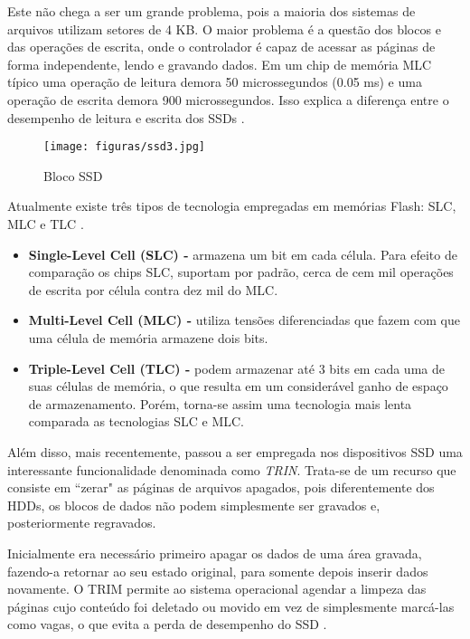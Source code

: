 Este não chega a ser um grande problema, pois a maioria dos sistemas de arquivos utilizam setores de 4 KB. O maior problema é a questão dos blocos e das operações de escrita, onde o controlador é capaz de acessar as páginas de forma independente, lendo e gravando dados. Em um chip de memória MLC típico uma operação de leitura demora 50 microssegundos (0.05 ms) e uma operação de escrita demora 900 microssegundos. Isso explica a diferença entre o desempenho de leitura e escrita dos SSDs \cite{ssd3}.

\begin{figure}[htb]
	\caption{\label{fig:ssd3}Bloco SSD}
	\begin{center}
	    \texttt{[image: figuras/ssd3.jpg]}
	\end{center}
\end{figure}

Atualmente existe três tipos de tecnologia empregadas em memórias Flash: SLC, MLC e TLC \cite{ssd}.
\begin{itemize}
\item \textbf{Single-Level Cell (SLC) -} armazena um bit em cada célula. Para efeito de comparação os chips SLC, suportam por padrão, cerca de cem mil operações de escrita por célula contra dez mil do MLC.

\item \textbf{Multi-Level Cell (MLC) -} utiliza tensões diferenciadas que fazem com que uma célula de memória armazene dois bits. 

\item \textbf{Triple-Level Cell (TLC) -} podem armazenar até 3 bits em cada uma de suas células de memória, o que resulta em um considerável ganho de espaço de armazenamento. Porém, torna-se assim uma tecnologia mais lenta comparada as tecnologias SLC e MLC.
\end{itemize}

Além disso, mais recentemente, passou a ser empregada nos dispositivos SSD uma interessante funcionalidade denominada como \textit{TRIN}. Trata-se de um recurso que consiste em “zerar"  as páginas de arquivos apagados, pois diferentemente dos HDDs, os blocos de dados não podem simplesmente ser gravados e, posteriormente regravados.

Inicialmente era necessário primeiro apagar os dados de uma área gravada, fazendo-a retornar ao seu estado original, para somente depois inserir dados novamente. O TRIM permite ao sistema operacional agendar a limpeza das páginas cujo conteúdo foi deletado ou movido em vez de simplesmente marcá-las como vagas, o que evita a perda de desempenho do SSD \cite{ssd3}.












